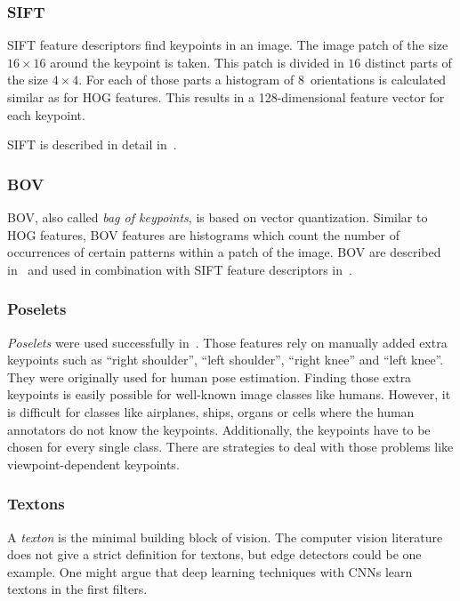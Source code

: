 \subsubsection{SIFT}
\Gls{SIFT} feature descriptors find keypoints in an image. The image patch of
the size $16 \times 16$ around the keypoint is taken. This patch is divided in
$16$ distinct parts of the size $4 \times 4$. For each of those parts a
histogram of 8~orientations is calculated similar as for \gls{HOG} features.
This results in a 128-dimensional feature vector for each keypoint.

\Gls{SIFT} is described in detail in~\cite{raey}.


\subsubsection{BOV}
\Gls{BOV}, also called \textit{bag of keypoints}, is based on vector
quantization. Similar to \gls{HOG} features, \gls{BOV} features are histograms
which count the number of occurrences of certain patterns within a patch of the
image. \Gls{BOV} are described in~\cite{csurka2004visual} and used in
combination with \gls{SIFT} feature descriptors in~\cite{csurka2008simple}.


\subsubsection{Poselets}
\textit{Poselets} were used successfully
in~\cite{bourdev2010detecting,brox2011object}. Those features rely on manually
added extra keypoints such as \enquote{right shoulder}, \enquote{left
shoulder}, \enquote{right knee} and \enquote{left knee}. They were originally
used for human pose estimation. Finding those extra keypoints is easily
possible for well-known image classes like humans. However, it is difficult for
classes like airplanes, ships, organs or cells where the human annotators do
not know the keypoints. Additionally, the keypoints have to be chosen for every
single class. There are strategies to deal with those problems like
viewpoint-dependent keypoints.


\subsubsection{Textons}\label{subsubsec:textons}
A \textit{texton} is the minimal building block of vision. The computer vision
literature does not give a strict definition for textons, but edge detectors
could be one example. One might argue that deep learning techniques with
\glspl{CNN} learn textons in the first filters.

